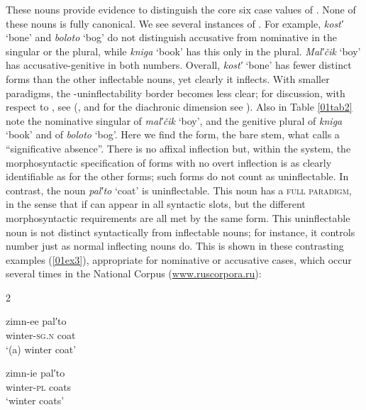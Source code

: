 \documentclass[output=paper,colorlinks,citecolor=brown]{langscibook}
\begin{document}

These nouns provide evidence to distinguish the core six case values of . None of these nouns is fully canonical. We see several instances of . For example, \textit{kost′} `bone' and \textit{boloto} `bog' do not distinguish accusative from nominative in the singular or the plural, while \textit{kniga} `book' has this  only in the plural. \textit{Mal′čik} `boy' has accusative-genitive  in both numbers. Overall, \textit{kost′} `bone' has fewer distinct forms than the other inflectable nouns, yet clearly it inflects. With smaller paradigms, the -uninflectability border becomes less clear; for discussion, with respect to , see (\citealt[71--72, 90--91]{thornton2019-noncanonical}, and for the diachronic dimension see \citealt{loporcaro2011}). Also in Table \ref{01tab2} note the nominative singular of \textit{mal′čik} `boy', and the genitive plural of \textit{kniga} `book' and of \textit{boloto} `bog'. Here we find the  form, the bare stem, what \citet[428n7]{stump2017} calls a ``significative absence''. There is no affixal inflection but, within the system, the morphosyntactic specification of forms with no overt inflection is as clearly identifiable as for the other forms; such forms do not count as uninflectable. In contrast, the noun \textit{pal′to} `coat' is uninflectable. This noun has a \textsc{full paradigm}, in the sense that if can appear in all syntactic slots, but the different morphosyntactic requirements are all met by the same form. This uninflectable noun is not distinct syntactically from inflectable nouns; for instance, it controls number  just as normal inflecting nouns do. This is shown in these contrasting examples (\ref{01ex3}), appropriate for nominative or accusative cases, which occur several times in the  National Corpus (\url{www.ruscorpora.ru}):

\begin{exe}
	\ex \label{01ex3}  \vspace*{-0.3cm}
	\begin{multicols}{2}
	\begin{xlist}
		\ex \gll zimn-ee pal′to \\
		winter-\textsc{sg.n} coat \\
		\trans ‘(a) winter coat’
		
		\ex \gll zimn-ie pal′to \\
		winter-\textsc{pl} coats \\
		\trans ‘winter coats’
	\end{xlist}
	\end{multicols}
\end{exe}
\end{document}
